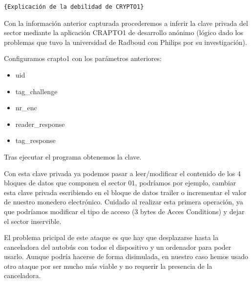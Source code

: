 \begin{verbatim}{Explicación de la debilidad de CRYPTO1}\end{verbatim}

Con la información anterior capturada procederemos a inferir la clave
privada del sector mediante la aplicación CRAPTO1 de desarrollo anónimo
(lógico dado los problemas que tuvo la universidad de Radboud con
Philips por su investigación).

Configuramos crapto1 con los parámetros anteriores:

\begin{itemize}
\item uid
\item tag\_challenge
\item nr\_enc
\item reader\_response
\item tag\_response
\end{itemize}

Tras ejecutar el programa obtenemos la clave.

Con esta clave privada ya podemos pasar a leer/modificar el contenido de
los 4 bloques de datos que componen el sector 01, podríamos por ejemplo,
cambiar esta clave privada escribiendo en el bloque de datos trailer o
incrementar el valor de nuestro monedero electrónico. Cuidado al
realizar esta primera operación, ya que podríamos modificar el tipo de
acceso (3 bytes de Acces Conditions) y dejar el sector inservible.

El problema pricipal de este ataque es que hay que desplazarse hasta la
canceladora del autobús con todos el dispositivo y un ordenador para
poder usarlo. Aunque podría hacerse de forma disimulada, en nuestro caso
hemos usado otro ataque por ser mucho más viable y no requerir la
presencia de la canceladora.
